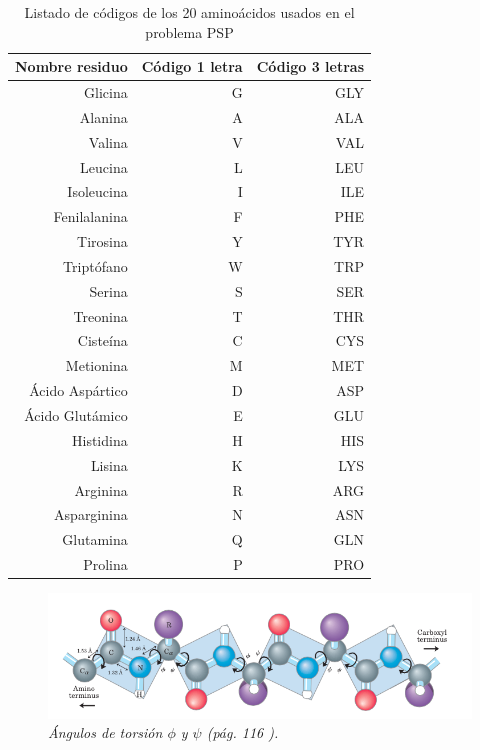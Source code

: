 \begin{table}[tp]
	\centering
	\caption[Listado de aminoácidos y sus códigos]{Listado de códigos de los 20 aminoácidos usados en el problema PSP}
	\begin{tabular}{|r|r|r|}
		\hline
		\textbf{Nombre residuo} & \textbf{Código 1 letra} & \textbf{Código 3 letras} \\ \hline
		Glicina 	        & G	& GLY	\\		
		Alanina 	        & A	& ALA	\\ 		
		Valina 	            & V	& VAL	\\  	
		Leucina 	        & L	& LEU	\\ 		
		Isoleucina 	        & I	& ILE	\\ 		
		Fenilalanina 		& F	& PHE	\\		
		Tirosina 			& Y	& TYR	\\	
		Triptófano 			& W	& TRP	\\
		Serina 	    		& S	& SER	\\	
		Treonina 			& T	& THR	\\	
		Cisteína 			& C	& CYS	\\
		Metionina 			& M	& MET	\\
		Ácido Aspártico     & D & ASP   \\
		Ácido Glutámico 	& E	& GLU	\\
		Histidina 			& H	& HIS	\\
		Lisina   			& K	& LYS	\\
		Arginina 			& R	& ARG	\\
		Asparginina 		& N	& ASN	\\
		Glutamina 			& Q	& GLN	\\
		Prolina 			& P	& PRO	\\ \hline
	\end{tabular}
	\label{table:aminoacids}
\end{table}

\begin{figure}[h]
	\centering
	\includegraphics[scale=.6]{images/phipsi.png}
	\caption{\em \'Angulos de torsi\'on $\phi$ y $\psi$ (pág. 116 \citealp{lehninger}).}
	\label{fig:phi-psi-exam}
\end{figure}

